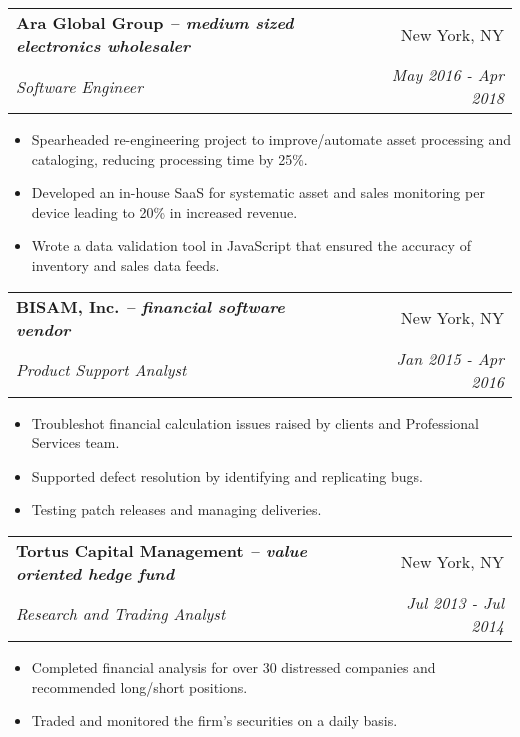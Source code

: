 \documentclass[letterpaper,10pt]{article}
\makeatletter
\newcommand{\resumeItemSimple}[1]{
    \item\small{
      {#1}{\vspace{-2pt}}
    }
  }
\newcommand{\resumeSubheading}[4]{
    \vspace{-1pt}\item
      \begin{tabular*}{0.97\textwidth}{l@{\extracolsep{\fill}}r}
        \textbf{#1} & #2 \\
        \textit{\small#3} & \textit{\small #4} \\
      \end{tabular*}\vspace{-5pt}
  }
\newcommand{\resumeItemListStart}{\begin{itemize}}
\newcommand{\resumeItemListEnd}{\end{itemize}\vspace{-5pt}}
\newcommand{\engineerType}{Software Engineer}
\makeatother
\begin{document}
      \resumeSubheading
        {Ara Global Group \normalfont\textit{-- medium sized electronics wholesaler}}{New York, NY}
        {\engineerType{}}{May 2016 - Apr 2018}
        \resumeItemListStart
        	\resumeItemSimple{Spearheaded re-engineering project to improve/automate asset processing and  cataloging, reducing processing time by 25\%.}
          \resumeItemSimple{Developed an in-house SaaS for systematic asset and sales monitoring per device leading to 20\% in increased revenue.}
          \resumeItemSimple{Wrote a data validation tool in JavaScript that ensured the accuracy of inventory and sales data feeds.}
        \resumeItemListEnd

      \resumeSubheading
        {BISAM, Inc. \normalfont\textit{-- financial software vendor}}{New York, NY}
        {Product Support Analyst}{Jan 2015 - Apr 2016}
        \resumeItemListStart
          \resumeItemSimple{Troubleshot financial calculation issues raised by clients and Professional Services team.}
          \resumeItemSimple{Supported defect resolution by identifying and replicating bugs.}
          \resumeItemSimple{Testing patch releases and managing deliveries.}
        \resumeItemListEnd

      \resumeSubheading
        {Tortus Capital Management \normalfont\textit{-- value oriented hedge fund}}{New York, NY}
        {Research and Trading Analyst}{Jul 2013 - Jul 2014}
        \resumeItemListStart
          \resumeItemSimple{Completed financial analysis for over 30 distressed companies and recommended long/short positions.}
          \resumeItemSimple{Traded and monitored the firm's securities on a daily basis.}
        \resumeItemListEnd



\end{document}
